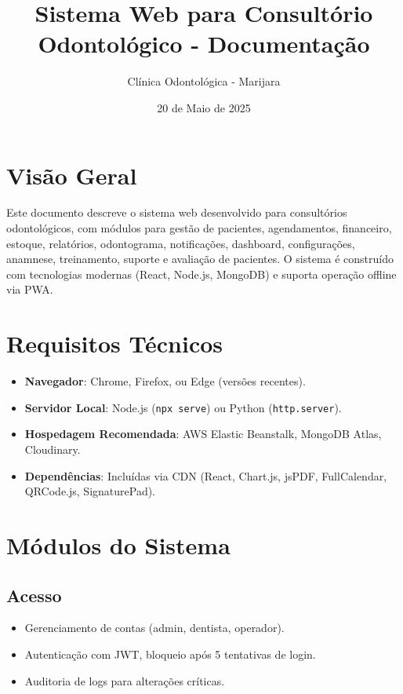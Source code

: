 \documentclass[a4paper,12pt]{article}
\begin{document}
\title{\textbf{Sistema Web para Consultório Odontológico - Documentação}}
\author{Clínica Odontológica - Marijara}
\date{20 de Maio de 2025}
\maketitle

\section{Visão Geral}
Este documento descreve o sistema web desenvolvido para consultórios odontológicos, com módulos para gestão de pacientes, agendamentos, financeiro, estoque, relatórios, odontograma, notificações, dashboard, configurações, anamnese, treinamento, suporte e avaliação de pacientes. O sistema é construído com tecnologias modernas (React, Node.js, MongoDB) e suporta operação offline via PWA.

\section{Requisitos Técnicos}
\begin{itemize}
    \item \textbf{Navegador}: Chrome, Firefox, ou Edge (versões recentes).
    \item \textbf{Servidor Local}: Node.js (\texttt{npx serve}) ou Python (\texttt{http.server}).
    \item \textbf{Hospedagem Recomendada}: AWS Elastic Beanstalk, MongoDB Atlas, Cloudinary.
    \item \textbf{Dependências}: Incluídas via CDN (React, Chart.js, jsPDF, FullCalendar, QRCode.js, SignaturePad).
\end{itemize}

\section{Módulos do Sistema}
\subsection{Acesso}
\begin{itemize}
    \item Gerenciamento de contas (admin, dentista, operador).
    \item Autenticação com JWT, bloqueio após 5 tentativas de login.
    \item Auditoria de logs para alterações críticas.
\end{itemize}
\end{document}
